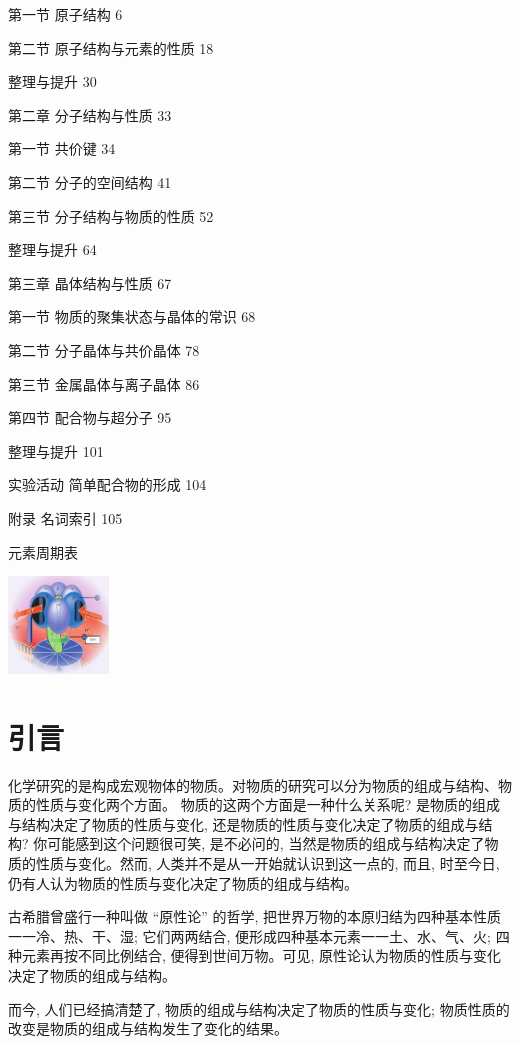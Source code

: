 \documentclass[10pt]{article}
\begin{document}
第一节 原子结构 6

第二节 原子结构与元素的性质 18

整理与提升 30

第二章 分子结构与性质 33

第一节 共价键 34

第二节 分子的空间结构 41

第三节 分子结构与物质的性质 52

整理与提升 64

第三章 晶体结构与性质 67

第一节 物质的聚集状态与晶体的常识 68

第二节 分子晶体与共价晶体 78

第三节 金属晶体与离子晶体 86

第四节 配合物与超分子 95

整理与提升 101

实验活动 简单配合物的形成 104

附录 名词索引 105

元素周期表

\begin{center}
\includegraphics[max width=0.2\textwidth]{images/0190e026-5a11-7df7-bd27-54d09026ba7a_4_884539.jpg}
\end{center}

\section*{引言}

化学研究的是构成宏观物体的物质。对物质的研究可以分为物质的组成与结构、物质的性质与变化两个方面。 物质的这两个方面是一种什么关系呢? 是物质的组成与结构决定了物质的性质与变化, 还是物质的性质与变化决定了物质的组成与结构? 你可能感到这个问题很可笑, 是不必问的, 当然是物质的组成与结构决定了物质的性质与变化。然而, 人类并不是从一开始就认识到这一点的, 而且, 时至今日, 仍有人认为物质的性质与变化决定了物质的组成与结构。

古希腊曾盛行一种叫做 “原性论” 的哲学, 把世界万物的本原归结为四种基本性质一一冷、热、干、湿; 它们两两结合, 便形成四种基本元素一一土、水、气、火; 四种元素再按不同比例结合, 便得到世间万物。可见, 原性论认为物质的性质与变化决定了物质的组成与结构。

而今, 人们已经搞清楚了, 物质的组成与结构决定了物质的性质与变化; 物质性质的改变是物质的组成与结构发生了变化的结果。
\end{document}
